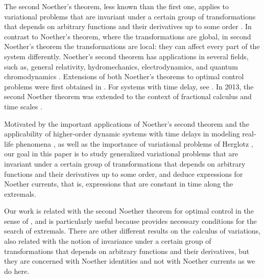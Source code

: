 \documentclass{my-aims}
\theoremstyle{definition}
\begin{document}
The second Noether's theorem, less known than the first one,
applies to variational problems that are invariant under 
a certain group of transformations that depends on arbitrary 
functions and their derivatives up to some order \cite{Torres2003MR1980565}. 
In contrast to Noether's theorem, where the transformations are global,
in second Noether's theorem the transformations are local: 
they can affect every part of the system differently.
Noether's second theorem has  applications in several fields, 
such as, general relativity, hydromechanics, electrodynamics,
and quantum chromodynamics \cite{MR3413358,MR2761345,MR3467590}. 
Extensions of both Noether's theorems to optimal control problems were 
first obtained in \cite{ejc,Torres:ConservLaws2002,Torres2003MR1980565,Torres2004}. 
For systems with time delay, see \cite{MR2970905}.
In 2013, the second Noether theorem was extended to the context of 
fractional calculus \cite{MR3179312} and time scales \cite{malinaNaty}.

Motivated by the important applications of Noether's second theorem \cite{malinaNaty}
and the applicability of higher-order dynamic systems with time delays
in modeling real-life phenomena \cite{MyID:304,MyID:253,MyID:353}, as well as the 
importance of variational problems of Herglotz \cite{Guenther1996,Herglotz1930},  
our goal in this paper is to study generalized variational problems 
that are invariant under a certain group of transformations 
that depends on arbitrary functions and their derivatives up to some order, 
and deduce expressions for Noether currents, that is, 
expressions that are constant in time along the extremals.

Our work is related with the second Noether theorem for optimal control
in the sense of \cite{Torres2003MR1980565}, and is particularly useful 
because provides necessary conditions for the search of extremals.
There are other different results on the calculus of variations, 
also related with the notion of invariance under a certain group 
of transformations that depends on arbitrary functions 
and their derivatives, but they are concerned with Noether identities 
\cite{Georgieva2005,malinaNaty,Agnieszka+Tatiana2016} 
and not with Noether currents as we do here.
\end{document}
